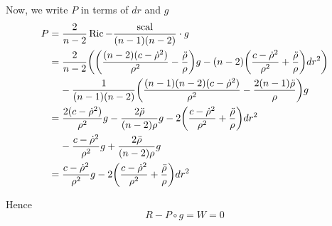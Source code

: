 Now, we write $P$ in terms of $dr$ and $g$ 
\begin{align*}
	P
	&= \frac{2}{n-2} \Ric - \frac{\scal}{(n-1)(n-2)} \cdot g \\
	&= \frac{2}{n-2} \tuple*{\tuple*{\frac{(n-2)(c - \dot{\rho}^2)}{\rho^2}  - \frac{\ddot{\rho}}{\rho}} g - (n-2) \tuple*{\frac{c - \dot{\rho}^2}{\rho^2}  + \frac{\ddot{\rho}}{\rho}} dr^2} \\
	&\;\;\;\; - \frac{1}{(n-1)(n-2)} \tuple*{\frac{(n-1)(n-2)(c - \dot{\rho}^2)}{\rho^2} - \frac{2(n-1) \ddot{\rho}}{\rho}} g \\
	&= \frac{2(c - \dot{\rho}^2)}{\rho^2}g - \frac{2 \ddot{\rho}}{(n-2) \rho} g - 2 \tuple*{\frac{c - \dot{\rho}^2}{\rho^2}  + \frac{\ddot{\rho}}{\rho}} dr^2 \\
	&\;\;\;\; - \frac{c - \dot{\rho}^2}{\rho^2} g + \frac{2 \ddot{\rho}}{(n-2)\rho} g \\
	&= \frac{c - \dot{\rho}^2}{\rho^2} g - 2 \tuple*{\frac{c - \dot{\rho}^2}{\rho^2}  + \frac{\ddot{\rho}}{\rho}} dr^2
\end{align*}


Hence
$$
	R - P \circ g = W = 0
$$


